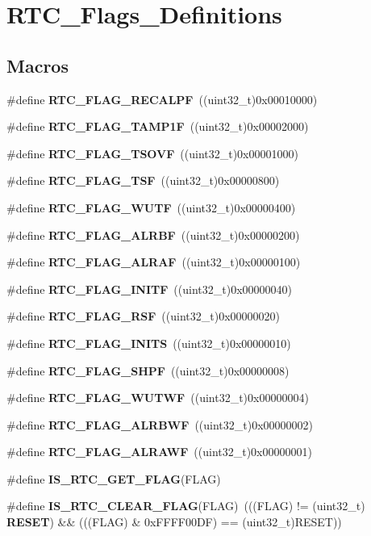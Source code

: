 \section{R\+T\+C\+\_\+\+Flags\+\_\+\+Definitions}
\label{group__RTC__Flags__Definitions}
\subsection*{Macros}
\begin{DoxyCompactItemize}
\item 
\#define \textbf{ R\+T\+C\+\_\+\+F\+L\+A\+G\+\_\+\+R\+E\+C\+A\+L\+PF}~((uint32\+\_\+t)0x00010000)
\item 
\#define \textbf{ R\+T\+C\+\_\+\+F\+L\+A\+G\+\_\+\+T\+A\+M\+P1F}~((uint32\+\_\+t)0x00002000)
\item 
\#define \textbf{ R\+T\+C\+\_\+\+F\+L\+A\+G\+\_\+\+T\+S\+O\+VF}~((uint32\+\_\+t)0x00001000)
\item 
\#define \textbf{ R\+T\+C\+\_\+\+F\+L\+A\+G\+\_\+\+T\+SF}~((uint32\+\_\+t)0x00000800)
\item 
\#define \textbf{ R\+T\+C\+\_\+\+F\+L\+A\+G\+\_\+\+W\+U\+TF}~((uint32\+\_\+t)0x00000400)
\item 
\#define \textbf{ R\+T\+C\+\_\+\+F\+L\+A\+G\+\_\+\+A\+L\+R\+BF}~((uint32\+\_\+t)0x00000200)
\item 
\#define \textbf{ R\+T\+C\+\_\+\+F\+L\+A\+G\+\_\+\+A\+L\+R\+AF}~((uint32\+\_\+t)0x00000100)
\item 
\#define \textbf{ R\+T\+C\+\_\+\+F\+L\+A\+G\+\_\+\+I\+N\+I\+TF}~((uint32\+\_\+t)0x00000040)
\item 
\#define \textbf{ R\+T\+C\+\_\+\+F\+L\+A\+G\+\_\+\+R\+SF}~((uint32\+\_\+t)0x00000020)
\item 
\#define \textbf{ R\+T\+C\+\_\+\+F\+L\+A\+G\+\_\+\+I\+N\+I\+TS}~((uint32\+\_\+t)0x00000010)
\item 
\#define \textbf{ R\+T\+C\+\_\+\+F\+L\+A\+G\+\_\+\+S\+H\+PF}~((uint32\+\_\+t)0x00000008)
\item 
\#define \textbf{ R\+T\+C\+\_\+\+F\+L\+A\+G\+\_\+\+W\+U\+T\+WF}~((uint32\+\_\+t)0x00000004)
\item 
\#define \textbf{ R\+T\+C\+\_\+\+F\+L\+A\+G\+\_\+\+A\+L\+R\+B\+WF}~((uint32\+\_\+t)0x00000002)
\item 
\#define \textbf{ R\+T\+C\+\_\+\+F\+L\+A\+G\+\_\+\+A\+L\+R\+A\+WF}~((uint32\+\_\+t)0x00000001)
\item 
\#define \textbf{ I\+S\+\_\+\+R\+T\+C\+\_\+\+G\+E\+T\+\_\+\+F\+L\+AG}(F\+L\+AG)
\item 
\#define \textbf{ I\+S\+\_\+\+R\+T\+C\+\_\+\+C\+L\+E\+A\+R\+\_\+\+F\+L\+AG}(F\+L\+AG)~(((F\+L\+AG) != (uint32\+\_\+t)\textbf{ R\+E\+S\+ET}) \&\& (((F\+L\+AG) \& 0x\+F\+F\+F\+F00\+D\+F) == (uint32\+\_\+t)\+R\+E\+S\+E\+T))
\end{DoxyCompactItemize}


